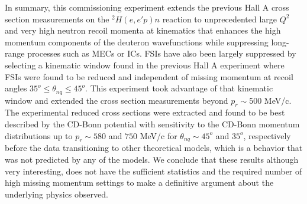 \twocolumngrid
\indent In summary, this commissioning experiment extends the previous Hall A cross section measurements on the $^{2}H(e,e'p)n$ reaction to 
unprecedented large $Q^{2}$ and very high neutron recoil momenta at kinematics that enhances the high momentum components of the deuteron wavefunctions
while suppressing long-range processes such as MECs or ICs. FSIs have also been largely suppressed by selecting a kinematic window found in the previous Hall A 
experiment where FSIs were found to be reduced and independent of missing momentum at recoil angles $35^{o}\leq\theta_{nq}\leq45^{o}$. This experiment took advantage
of that kinematic window and extended the cross section measurements beyond $p_{r}\sim$500 MeV/c. The experimental reduced cross sections were extracted and found to
be best described by the CD-Bonn potential with sensitivity to the CD-Bonn momentum distributions up to $p_{r}\sim580$ and $750$ MeV/c for $\theta_{nq}\sim45^{o}$ and $35^{o}$,
respectively before the data transitioning to other theoretical models, which is a behavior that was not predicted by any of the models. We conclude that these results although
very interesting, does not have the sufficient statistics and the required number of high missing momentum settings to make a definitive argument about the underlying physics observed.




